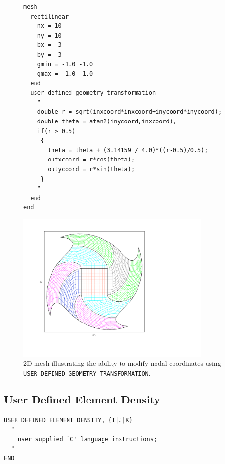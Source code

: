 \begin{figure}[t]
  \centering
    \begin{minipage}{0.3\linewidth}
{\ttfamily \begin{verbatim}










mesh
  rectilinear
    nx = 10
    ny = 10
    bx =  3
    by =  3
    gmin = -1.0 -1.0
    gmax =  1.0  1.0
  end
  user defined geometry transformation
    "
    double r = sqrt(inxcoord*inxcoord+inycoord*inycoord);
    double theta = atan2(inycoord,inxcoord);
    if(r > 0.5)
     {
       theta = theta + (3.14159 / 4.0)*((r-0.5)/0.5);
       outxcoord = r*cos(theta);
       outycoord = r*sin(theta);
     }
    "
  end
end
\end{verbatim}}
    \end{minipage}%
    \hfill
    \begin{minipage}[t]{0.65\linewidth}
        \includegraphics[width=3.8in]{figures/mesh_warp_2d_white_bg}
    \end{minipage}
    \caption [2D Geometry Transformation Example]{2D mesh illustrating the ability to modify nodal coordinates using \texttt{USER
      DEFINED GEOMETRY TRANSFORMATION}.}
    \label{fig:2d_transform_example}
\end{figure}


\clearpage
\subsection{User Defined Element Density}
\label{sec:inline-element-density}


{\ttfamily \small \begin{verbatim}
USER DEFINED ELEMENT DENSITY, {I|J|K}
  "
    user supplied `C' language instructions;
  "
END
\end{verbatim}
}

